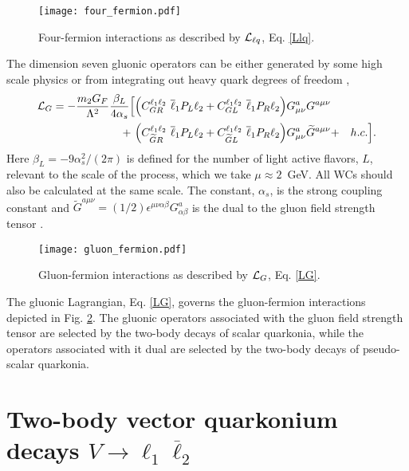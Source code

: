 \documentclass[12pt]{article}
\begin{document}
\begin{figure}[htbp]
    \centering
        \texttt{[image: four\_fermion.pdf]}
        \vspace{0cm}
    \caption{Four-fermion interactions as described by ${\cal L}_{\ell q}$, Eq. \ref{Llq}.}
    \label{fig:Llq}
\end{figure}

The dimension seven gluonic operators can be either generated by some high scale physics or 
from integrating out heavy quark degrees of freedom \cite{Celis:2014asa,Petrov:2013vka},
%
\begin{eqnarray}\label{LG}
{\cal L}_{G} = -\frac{m_2 G_F}{\Lambda^2} \frac{\beta_L}{4\alpha_s} \Big[
\Big( C_{GR}^{\ell_1\ell_2} \ \overline\ell_1 P_L \ell_2 + 
C_{GL}^{\ell_1\ell_2} \ \overline\ell_1 P_R \ell_2 \Big)  G_{\mu\nu}^a G^{a \mu\nu} &&
\nonumber \\
+ ~ \Big( C_{\widetilde G R}^{\ell_1\ell_2} \ \overline\ell_1 P_L \ell_2 + 
C_{\widetilde G L}^{\ell_1\ell_2} \ \overline\ell_1 P_R \ell_2 \Big)  G_{\mu\nu}^a \widetilde G^{a \mu\nu}
 &+& h.c. \Big].
\end{eqnarray}
% 
Here $\beta_L=-9 \alpha_s^2/(2\pi)$ is defined for the number of light active flavors, $L$, relevant to the scale 
of the process, which we take $\mu \approx 2$~GeV. All WCs 
should also be calculated at the same scale. The constant, $\alpha_s$, is the strong coupling constant and 
$\widetilde G^{a \mu\nu} = (1/2) \epsilon^{\mu\nu\alpha\beta} G^a_{\alpha\beta}$ is the dual to the
gluon field strength tensor \cite{Celis:2014asa}.

\begin{figure}[htbp]
    \centering
        \texttt{[image: gluon\_fermion.pdf]}
        \vspace{0cm}
    \caption{Gluon-fermion interactions as described by ${\cal L}_{G}$, Eq. \ref{LG}.}
    \label{fig:LG}
\end{figure}

The gluonic Lagrangian, Eq. \ref{LG}, governs the gluon-fermion interactions depicted in Fig. \ref{fig:LG}. 
The gluonic operators associated with the gluon field strength tensor are selected by the two-body 
decays of scalar quarkonia, while the operators associated with it dual are selected by the two-body 
decays of pseudo-scalar quarkonia.


\section{Two-body vector quarkonium decays $V \to \ell_1 \overline \ell_2$} \label{sec:2bodyVec}
\end{document}
